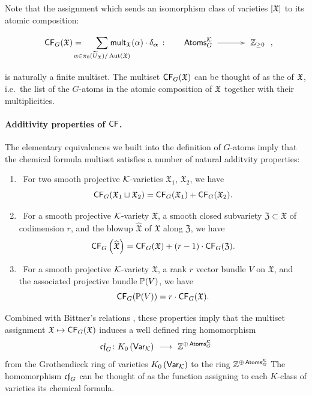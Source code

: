 \documentclass[twoside,leqno]{article}
\numberwithin{equation}{section}
\theoremstyle{plain}
\theoremstyle{definition}
\begin{document}
\medskip


Note that the 
assignment
which sends an isomorphism class of varieties $[\mathfrak X]$ to its atomic composition:
\[
\xymatrix@C+0.7pc@M+0.3pc{ 
\CF_{G}(\mathfrak{X}) = {\displaystyle \hspace{-1pc} \sum_{\alpha \in \pi_{0}(\tU_{\fX})/\op{Aut}(\mathfrak{X})}} \hspace{-2pc}  \mathsf{mult}_{\mathfrak{X}}(\alpha)
 \cdot \delta_{\balpha}\, : \, \hspace{-2pc} & 
\mathsf{Atoms}_{G}^{\kay} \ar[r] & \bbZ_{\geq 0}},
\]
is naturally a finite  multiset. The multiset $\mathsf{CF}_{G}(\mathfrak{X})$ can be thought of as the  of $\mathfrak X$, i.e.\ the list of the $G$-atoms in the atomic composition of $\mathfrak X$ together with their multiplicities.


\paragraph{Additivity properties of \texorpdfstring{$\mathsf{CF}$}{CF}.} \label{par:CF}
The elementary equivalences we built into the definition of $G$-atoms imply that the chemical formula multiset satisfies a number of natural additvity properties:
\begin{enumerate}[wide]
\item[{\bfseries (1)}] \, For two smooth projective $\mathcal K$-varieties $\mathfrak{X}_1$, $\mathfrak{X}_2$, we have
    \[ \mathsf{CF}_G(\mathfrak{X}_1 \sqcup \mathfrak{X}_2) = \mathsf{CF}_{G}(\mathfrak{X}_1) + \mathsf{CF}_{G}(\mathfrak{X}_2). \]
\item[{\bfseries (2)}] \,  For a smooth projective $\mathcal K$-variety $\mathfrak{X}$, a smooth closed subvariety $\mathfrak{Z} \subset \mathfrak{X}$ of codimension $r$, and the blowup $\widehat{\mathfrak{X}}$ of $\mathfrak{X}$ along $\mathfrak{Z}$, we have
    \[ \mathsf{CF}_{G}\left(\widehat{\mathfrak{X}}\right) = \mathsf{CF}_{G}(\mathfrak{X}) + (r-1)\cdot 
    \mathsf{CF}_{G}(\mathfrak{Z}). \]
\item[{\bfseries (3)}] \, For a smooth projective $\mathcal K$-variety $\mathfrak{X}$, a rank $r$ vector bundle $V$ on $\mathfrak{X}$, and the associated projective bundle $\mathbb P(V)$, we have
    \[ \mathsf{CF}_{G}(\mathbb P(V)) = r \cdot \mathsf{CF}_{G}(\mathfrak{X}) .\]
\end{enumerate}    

\medskip

Combined with Bittner's  relations \cite{Bittner}, these properties imply  that the multiset 
assignment $\mathfrak X \mapsto \mathsf{CF}_{G}(\mathfrak{X})$
induces a well defined ring 
homomorphism 
\[
\mathfrak{cf}_{G} \colon K_0\left(\mathsf{Var}_{\mathcal K}\right) \ \longrightarrow  \ \mathbb Z^{\oplus \, \mathsf{Atoms}^{\mathcal K}_{G}}
\]
from the Grothendieck ring of varieties $K_0\left(\mathsf{Var}_{\mathcal K}\right)$ to the ring 
$\mathbb Z^{\oplus \, \mathsf{Atoms}^{\mathcal K}_{G}}$
The homomorphism $\mathfrak{cf}_{G}$ can be thought of as the function assigning to each $K$-class of varieties its chemical formula.
\end{document}
